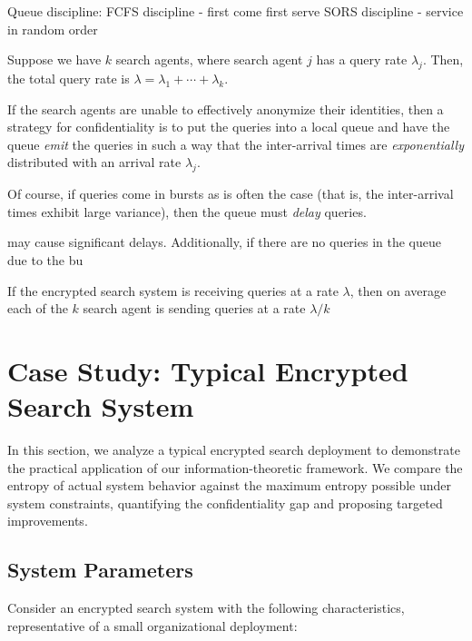 \documentclass[final,11pt]{article}
\numberwithin{equation}{section}
\theoremstyle{plain}
\theoremstyle{remark}
\begin{document}
Queue discipline:
FCFS discipline - first come first serve
SORS discipline - service in random order


Suppose we have $k$ search agents, where search agent $j$ has a query rate $\lambda_j$. Then, the total query rate is $\lambda = \lambda_1 + \cdots + \lambda_k$.

If the search agents are unable to effectively anonymize their identities, then a strategy for confidentiality is to put the queries into a local queue and have the queue \emph{emit} the queries in such a way that the inter-arrival times are \emph{exponentially} distributed with an arrival rate $\lambda_j$.

Of course, if queries come in bursts as is often the case (that is, the inter-arrival times exhibit large variance), then the queue must \emph{delay} queries.

may cause significant delays. Additionally, if there are no queries in the queue due to the bu



If the encrypted search system is receiving queries at a rate $\lambda$, then on average each of the $k$ search agent is sending queries at a rate $\lambda / k$





\section{Case Study: Typical Encrypted Search System}
\label{sec:casestudy}

In this section, we analyze a typical encrypted search deployment to demonstrate the practical application of our information-theoretic framework. We compare the entropy of actual system behavior against the maximum entropy possible under system constraints, quantifying the confidentiality gap and proposing targeted improvements.

\subsection{System Parameters}
Consider an encrypted search system with the following characteristics, representative of a small organizational deployment:
\end{document}
